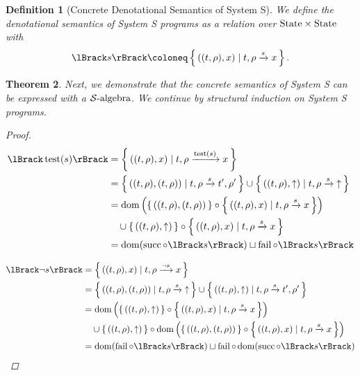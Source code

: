 \documentclass{article}
\newtheorem{theorem}{Theorem}
\newtheorem{definition}[theorem]{Definition}
\newcommand{\fail}{\ensuremath \text{$\uparrow$}}
\newcommand{\test}[1]{\ensuremath \operatorname{test}(#1)}
\newcommand{\transform}[5]{#1, #2 \xrightarrow{#3} #4, #5}
\newcommand{\transformx}[4]{#1, #2 \xrightarrow{#3} #4}
\newcommand{\transformfail}[3]{#1, #2 \xrightarrow{#3} \fail}
\newcommand{\sem}[1]{\ensuremath \lBrack #1 \rBrack}
\newcommand{\State}{\ensuremath \text{State}}
\newcommand{\setbuild}[2]{\ensuremath \left\{\, #1 \mid #2 \,\right\}}
\newcommand{\setbuildc}[1]{\ensuremath \left\{\, #1 \,\right\}}
\newcommand{\Salgebra}{\ensuremath \mathcal{S}\text{-algebra}}
\newcommand{\domain}{\ensuremath \operatorname{dom}}
\newcommand{\lfail}{\ensuremath \operatorname{fail}}
\newcommand{\lsucc}{\ensuremath \operatorname{succ}}
\begin{document}
\begin{definition}[Concrete Denotational Semantics of System S] \normalfont
  We define the denotational semantics of System S programs as a relation over $\State \times \State$ with \[\sem{s} \coloneq \setbuild{((t,\rho),x)}{\transformx{t}{\rho}{s}{x}}.\]
\end{definition}

\begin{theorem} \normalfont
  Next, we demonstrate that the concrete semantics of System S can be expressed with a $\Salgebra$. We continue by structural induction on System S programs.
\begin{proof}

\begin{align*}
  \sem{\test{s}}
     &= \setbuild{((t,\rho),x)}{\transformx{t}{\rho}{\test{s}}{x}} \\
     &= \setbuild{((t,\rho),(t,\rho))}{\transform{t}{\rho}{s}{t'}{\rho'}} \cup
        \setbuild{((t,\rho),\fail)}{\transformfail{t}{\rho}{s}} \\
     &= \domain\left(\setbuildc{((t,\rho),(t,\rho))} \circ \setbuild{((t,\rho),x)}{\transformx{t}{\rho}{s}{x}}\right) \\
     &\quad \cup \setbuildc{((t,\rho),\fail)} \circ \setbuild{((t,\rho),x)}{\transformx{t}{\rho}{s}{x}} \\
     &= \domain(\lsucc \circ \sem{s}) \sqcup \lfail \circ \sem{s}
\end{align*}

\begin{align*}
  \sem{\neg{s}}
    &= \setbuild{((t,\rho),x)}{\transformx{t}{\rho}{\neg{s}}{x}} \\
    &= \setbuild{((t,\rho),(t,\rho))}{\transformfail{t}{\rho}{s}} \cup \setbuild{((t,\rho),\fail)}{\transform{t}{\rho}{s}{t'}{\rho'}} \\
    &= \domain\left(\setbuildc{((t,\rho),\fail)} \circ \setbuild{((t,\rho),x)}{\transformx{t}{\rho}{s}{x}}\right) \\
    &\quad \cup \setbuildc{((t,\rho),\fail)} \circ \domain\left(\setbuildc{((t,\rho),(t,\rho))} \circ \setbuild{((t,\rho),x)}{\transformx{t}{\rho}{s}{x}}\right) \\
    &= \domain(\lfail \circ \sem{s}) \sqcup \lfail \circ \domain(\lsucc \circ \sem{s})
\end{align*}


\end{proof}
\end{theorem}
\end{document}
